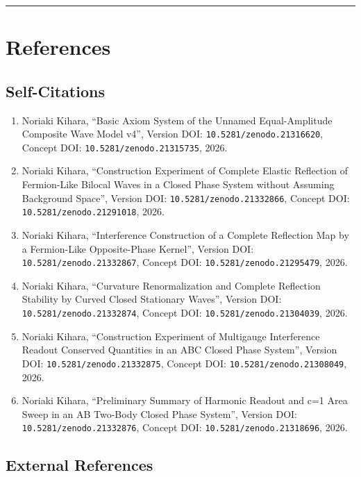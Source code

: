 \documentclass[
]{article}
\providecommand{\tightlist}{%
  \setlength{\itemsep}{0pt}\setlength{\parskip}{0pt}}
\begin{document}
\begin{center}\rule{0.5\linewidth}{0.5pt}\end{center}

\section{References}\label{references}

\subsection{Self-Citations}\label{self-citations}

\begin{enumerate}
\def\labelenumi{\arabic{enumi}.}
\tightlist
\item
  Noriaki Kihara, ``Basic Axiom System of the Unnamed Equal-Amplitude
  Composite Wave Model v4'', Version DOI:
  \texttt{10.5281/zenodo.21316620}, Concept DOI:
  \texttt{10.5281/zenodo.21315735}, 2026.
\item
  Noriaki Kihara, ``Construction Experiment of Complete Elastic
  Reflection of Fermion-Like Bilocal Waves in a Closed Phase System
  without Assuming Background Space'', Version DOI:
  \texttt{10.5281/zenodo.21332866}, Concept DOI:
  \texttt{10.5281/zenodo.21291018}, 2026.
\item
  Noriaki Kihara, ``Interference Construction of a Complete Reflection
  Map by a Fermion-Like Opposite-Phase Kernel'', Version DOI:
  \texttt{10.5281/zenodo.21332867}, Concept DOI:
  \texttt{10.5281/zenodo.21295479}, 2026.
\item
  Noriaki Kihara, ``Curvature Renormalization and Complete Reflection
  Stability by Curved Closed Stationary Waves'', Version DOI:
  \texttt{10.5281/zenodo.21332874}, Concept DOI:
  \texttt{10.5281/zenodo.21304039}, 2026.
\item
  Noriaki Kihara, ``Construction Experiment of Multigauge Interference
  Readout Conserved Quantities in an ABC Closed Phase System'', Version
  DOI: \texttt{10.5281/zenodo.21332875}, Concept DOI:
  \texttt{10.5281/zenodo.21308049}, 2026.
\item
  Noriaki Kihara, ``Preliminary Summary of Harmonic Readout and c=1 Area
  Sweep in an AB Two-Body Closed Phase System'', Version DOI:
  \texttt{10.5281/zenodo.21332876}, Concept DOI:
  \texttt{10.5281/zenodo.21318696}, 2026.
\end{enumerate}

\subsection{External References}\label{external-references}
\end{document}
